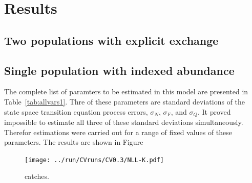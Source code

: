 \documentclass[12pt,letterpaper,twoside]{article}
\newcommand\help[1]{\color{Magenta}{\it #1 }\normalcolor}
\begin{document}
\section{Results}
\subsection{Two populations with explicit exchange}
\help{Preliminary results of the two population model were presented
in a previous report. More work has been done on model interpretation
and these previous results need revision.}

\subsection{Single population with indexed abundance}
The complete list of paramters to be estimated in this model are
presented in Table~\ref{tab:allvars1}. Thre of these parameters are
standard deviations of the state space transition equation process
errors, $\sigma_N$, $\sigma_F$, and $\sigma_Q$. It proved impossible
to estimate all three of these standard deviations simultaneously.
Therefor estimations were carried out for a range of fixed values of
these parameters. The results are shown in Figure

\begin{figure}
\begin{center}
\texttt{[image: ../run/CVruns/CV0.3/NLL-K.pdf]}
\caption{\label{fig:nll-K-CV}
catches.}
\end{center}
\end{figure}




\end{document}
